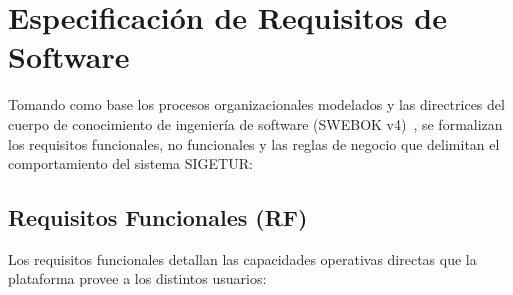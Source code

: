 \section{Especificación de Requisitos de Software}
Tomando como base los procesos organizacionales modelados y las directrices del cuerpo de conocimiento de ingeniería de software (SWEBOK v4)~\cite{swebok2024}, %
se formalizan los requisitos funcionales, no funcionales y las reglas de negocio que delimitan el comportamiento del sistema SIGETUR:

\subsection{Requisitos Funcionales (RF)}
Los requisitos funcionales detallan las capacidades operativas directas que la plataforma provee a los distintos usuarios:

